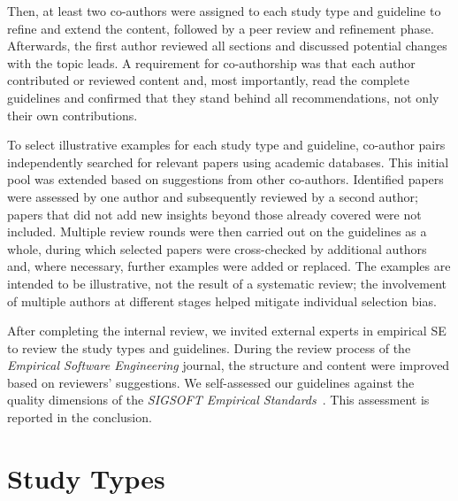 Then, at least two co-authors were assigned to each study type and guideline to refine and extend the content, followed by a peer review and refinement phase.
Afterwards, the first author reviewed all sections and discussed potential changes with the topic leads.
A requirement for co-authorship was that each author contributed or reviewed content and, most importantly, read the complete guidelines and confirmed that they stand behind all recommendations, not only their own contributions.

To select illustrative examples for each study type and guideline, co-author pairs independently searched for relevant papers using academic databases.
This initial pool was extended based on suggestions from other co-authors.
Identified papers were assessed by one author and subsequently reviewed by a second author; papers that did not add new insights beyond those already covered were not included.
Multiple review rounds were then carried out on the guidelines as a whole, during which selected papers were cross-checked by additional authors and, where necessary, further examples were added or replaced.
The examples are intended to be illustrative, not the result of a systematic review; the involvement of multiple authors at different stages helped mitigate individual selection bias.

After completing the internal review, we invited external experts in empirical SE to review the study types and guidelines.
During the review process of the \emph{Empirical Software Engineering} journal, the structure and content were improved based on reviewers' suggestions.
We self-assessed our guidelines against the quality dimensions of the \emph{SIGSOFT Empirical Standards}~\citep{ralph2021empiricalstandardssoftwareengineering}. This assessment is reported in the conclusion.


\section{Study Types}
\label{sec:study-types}



